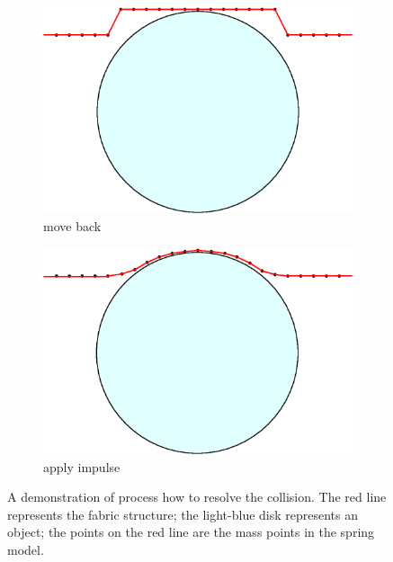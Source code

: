 \begin{figure}[!ht]
    \begin{subfigure}{0.48\columnwidth}
	\includegraphics[width=\textwidth]{figures/collsn_demo_2}
	\caption{move back}
    \end{subfigure}
    \begin{subfigure}{0.48\columnwidth}
	\includegraphics[width=\textwidth]{figures/collsn_demo_3}
	\caption{apply impulse}
    \end{subfigure}
    \caption{A demonstration of process how to resolve the collision. The red 
    line represents the fabric structure; the light-blue disk represents an 
    object; the points on the red line are the mass points in the spring 
    model.}
    \label{fig:collsn_demo}
\end{figure}

